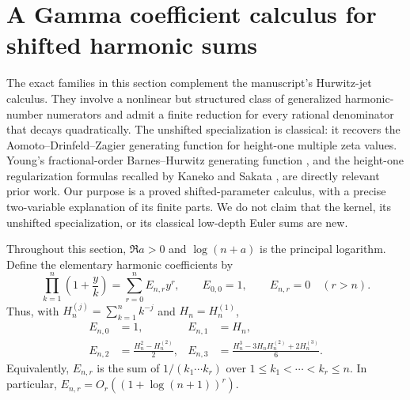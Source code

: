 \section{A Gamma coefficient calculus for shifted harmonic sums}
\label{harm:sec:coefficient-calculus}

The exact families in this section complement the manuscript's Hurwitz-jet
calculus.  They involve a nonlinear but structured class of generalized
harmonic-number numerators and admit a finite reduction for every rational
denominator that decays quadratically.  The unshifted specialization is
classical: it recovers the Aomoto--Drinfeld--Zagier generating function for
height-one multiple zeta values.  Young's fractional-order Barnes--Hurwitz
generating function \cite{harm:Young2024}, and the height-one regularization
formulas recalled by Kaneko and Sakata \cite{harm:KanekoSakata}, are directly
relevant prior work.  Our purpose is a proved shifted-parameter calculus,
with a precise two-variable explanation of its finite parts.  We do not
claim that the kernel, its unshifted specialization, or its classical
low-depth Euler sums are new.

Throughout this section, $\Re a>0$ and $\log(n+a)$ is the principal
logarithm.  Define the elementary harmonic coefficients by
\begin{equation}\label{harm:eq:elementary}
 \prod_{k=1}^{n}\left(1+\frac{y}{k}\right)
 =\sum_{r=0}^{n} E_{n,r}y^r,
 \qquad E_{0,0}=1,
 \qquad E_{n,r}=0\quad(r>n).
\end{equation}
Thus, with $H_n^{(j)}=\sum_{k=1}^n k^{-j}$ and $H_n=H_n^{(1)}$,
\begin{align}
 E_{n,0}&=1, &E_{n,1}&=H_n,\\
 E_{n,2}&=\frac{H_n^2-H_n^{(2)}}2,
 &E_{n,3}&=\frac{H_n^3-3H_nH_n^{(2)}+2H_n^{(3)}}6.
 \label{harm:eq:first-elementaries}
\end{align}
Equivalently, $E_{n,r}$ is the sum of $1/(k_1\cdots k_r)$ over
$1\le k_1<\cdots<k_r\le n$.  In particular,
$E_{n,r}=O_r((1+\log(n+1))^r)$.

